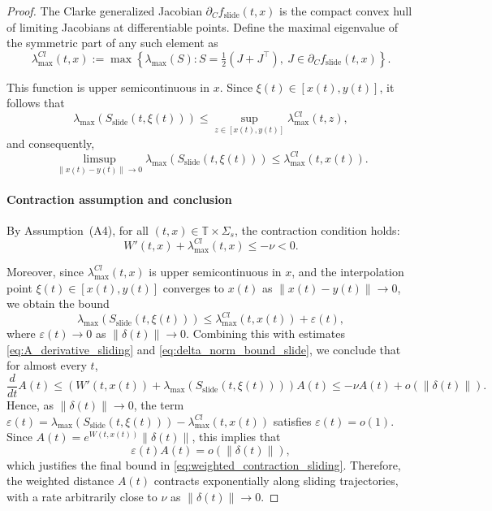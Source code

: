 \documentclass[11pt]{article}
\begin{document}
\begin{proof}
The Clarke generalized Jacobian \( \partial_C f_{\mathrm{slide}}(t, x) \) is the compact convex hull of limiting Jacobians at differentiable points. Define the maximal eigenvalue of the symmetric part of any such element as
\begin{equation} \label{eq:lambda_cl_slide}
	\lambda_{\max}^{Cl}(t, x) := \max \left\{ \lambda_{\max}(S) : S = \tfrac{1}{2}(J + J^\top),\ J \in \partial_C f_{\mathrm{slide}}(t, x) \right\}.
\end{equation}

This function is upper semicontinuous in \( x \). Since \( \xi(t) \in [x(t), y(t)] \), it follows that
\begin{equation} \label{eq:lambda_slide_limit}
	\lambda_{\max}\left( S_{\mathrm{slide}}(t, \xi(t)) \right) \leq \sup_{z \in [x(t), y(t)]} \lambda_{\max}^{Cl}(t, z),
\end{equation}
and consequently,
\begin{equation}
	\limsup_{\|x(t) - y(t)\| \to 0} \lambda_{\max}\left( S_{\mathrm{slide}}(t, \xi(t)) \right) \leq \lambda_{\max}^{Cl}(t, x(t)).
\end{equation}


\paragraph{Contraction assumption and conclusion}

By Assumption~(A4), for all \( (t,x) \in \mathbb{T} \times \Sigma_s \), the contraction condition holds:
\begin{equation} \label{eq:A4_sliding_contraction}
	W'(t,x) + \lambda_{\max}^{Cl}(t,x) \leq -\nu < 0.
\end{equation}

Moreover, since \( \lambda_{\max}^{Cl}(t,x) \) is upper semicontinuous in \( x \), and the interpolation point \( \xi(t) \in [x(t), y(t)] \) converges to \( x(t) \) as \( \|x(t) - y(t)\| \to 0 \), we obtain the bound
\[
\lambda_{\max}(S_{\mathrm{slide}}(t, \xi(t))) \leq \lambda_{\max}^{Cl}(t, x(t)) + \varepsilon(t),
\]
where \( \varepsilon(t) \to 0 \) as \( \|\delta(t)\| \to 0 \). Combining this with estimates \eqref{eq:A_derivative_sliding} and \eqref{eq:delta_norm_bound_slide}, we conclude that for almost every \( t \),
\begin{equation} \label{eq:weighted_contraction_sliding}
	\frac{d}{dt} A(t) \leq \left( W'(t, x(t)) + \lambda_{\max}(S_{\mathrm{slide}}(t, \xi(t))) \right) A(t) \leq -\nu A(t) + o(\|\delta(t)\|).
\end{equation}
Hence, as \( \|\delta(t)\| \to 0 \), the term \( \varepsilon(t) = \lambda_{\max}(S_{\mathrm{slide}}(t, \xi(t))) - \lambda_{\max}^{Cl}(t, x(t)) \) satisfies \( \varepsilon(t) = o(1) \). Since \( A(t) = e^{W(t,x(t))} \|\delta(t)\| \), this implies that
\[
\varepsilon(t) A(t) = o(\|\delta(t)\|),
\]
which justifies the final bound in \eqref{eq:weighted_contraction_sliding}. Therefore, the weighted distance \( A(t) \) contracts exponentially along sliding trajectories, with a rate arbitrarily close to \( \nu \) as \( \|\delta(t)\| \to 0 \).




\end{proof}
\end{document}
